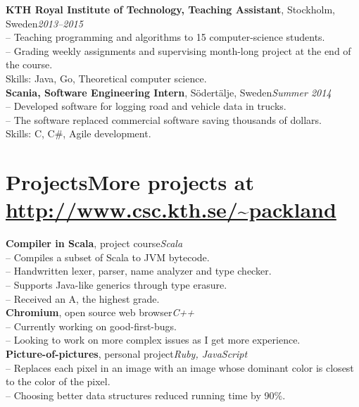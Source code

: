 \documentclass[10pt]{article}
\begin{document}
\noindent\textbf{KTH Royal Institute of Technology, Teaching Assistant}, Stockholm, Sweden\hfill\textit{2013--2015}\\
\indent-- Teaching programming and algorithms to 15 computer-science students.\\
\indent-- Grading weekly assignments and supervising month-long project at the end of the course. \\
\indent Skills: Java, Go, Theoretical computer science. \\

\noindent\textbf{Scania, Software Engineering Intern}, Södertälje, Sweden\hfill\textit{Summer 2014}\\
\indent-- Developed software for logging road and vehicle data in trucks.\\
\indent-- The software replaced commercial software saving thousands of dollars.\\
\indent Skills: C, C\#, Agile development.\\

\section*{Projects\hfill {\normalsize\normalfont  More projects at \url{http://www.csc.kth.se/~packland}}}
\vspace{0.1em}
\hline
\vspace{0.3em}
\noindent\textbf{Compiler in Scala}, project course\hfill\textit{Scala}\\
\indent-- Compiles a subset of Scala to JVM bytecode.\\
\indent-- Handwritten lexer, parser, name analyzer and type checker.\\
\indent-- Supports Java-like generics through type erasure.\\
\indent-- Received an A, the highest grade.\\

\noindent\textbf{Chromium}, open source web browser\hfill \textit{C++} \\
\indent-- Currently working on good-first-bugs. \\
\indent-- Looking to work on more complex issues as I get more experience.\\

\noindent\textbf{Picture-of-pictures}, personal project\hfill \textit{Ruby, JavaScript} \\
\indent-- Replaces each pixel in an image with an image whose dominant color is closest to the color of the pixel.\\
\indent-- Choosing better data structures reduced running time by 90\%. \\
\end{document}
